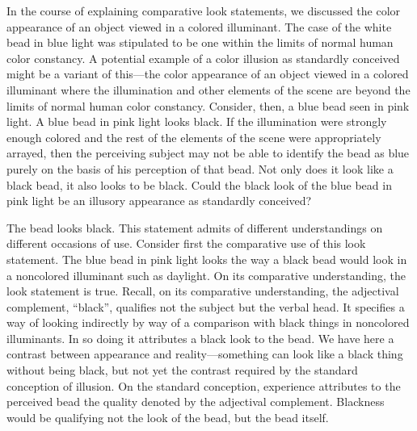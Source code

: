 \documentclass[12pt]{article}
\begin{document}
In the course of explaining comparative look statements, we discussed the color appearance of an object viewed in a colored illuminant. The case of the white bead in blue light was stipulated to be one within the limits of normal human color constancy. A potential example of a color illusion as standardly conceived might be a variant of this---the color appearance of an object viewed in a colored illuminant where the illumination and other elements of the scene are beyond the limits of normal human color constancy. Consider, then, a blue bead seen in pink light. A blue bead in pink light looks black. If the illumination were strongly enough colored and the rest of the elements of the scene were appropriately arrayed, then the perceiving subject may not be able to identify the bead as blue purely on the basis of his perception of that bead. Not only does it look like a black bead, it also looks to be black. Could the black look of the blue bead in pink light be an illusory appearance as standardly conceived? 


The bead looks black. This statement admits of different understandings on different occasions of use. Consider first the comparative use of this look statement. The blue bead in pink light looks the way a black bead would look in a noncolored illuminant such as daylight. On its comparative understanding, the look statement is true. Recall, on its comparative understanding, the adjectival complement, ``black'', qualifies not the subject but the verbal head. It specifies a way of looking indirectly by way of a comparison with black things in noncolored illuminants. In so doing it attributes a black look to the bead. We have here a contrast between appearance and reality---something can look like a black thing without being black, but not yet the contrast required by the standard conception of illusion. On the standard conception, experience attributes to the perceived bead the quality denoted by the adjectival complement. Blackness would be qualifying not the look of the bead, but the bead itself. 
\end{document}
